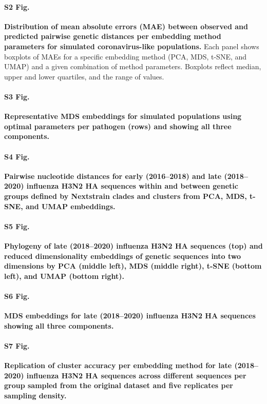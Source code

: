\documentclass[10pt,letterpaper]{article}
\begin{document}
\paragraph*{S2 Fig.}
\label{S2_Fig_simulated_coronavirus_errors}
{\bf Distribution of mean absolute errors (MAE) between observed and predicted pairwise genetic distances per embedding method parameters for simulated coronavirus-like populations.} Each panel shows boxplots of MAEs for a specific embedding method (PCA, MDS, t-SNE, and UMAP) and a given combination of method parameters. Boxplots reflect median, upper and lower quartiles, and the range of values.

\paragraph*{S3 Fig.}
\label{S3_Fig_simulated_representative_mds_embeddings}
{\bf Representative MDS embeddings for simulated populations using optimal parameters per pathogen (rows) and showing all three components.}

\paragraph*{S4 Fig.}
\label{S4_Fig_flu_within_between_group_distances}
{\bf Pairwise nucleotide distances for early (2016--2018) and late (2018--2020) influenza H3N2 HA sequences within and between genetic groups defined by Nextstrain clades and clusters from PCA, MDS, t-SNE, and UMAP embeddings.}

\paragraph*{S5 Fig.}
\label{S5_Fig_late_flu_embeddings_by_clade}
{\bf Phylogeny of late (2018--2020) influenza H3N2 HA sequences (top) and reduced dimensionality embeddings of genetic sequences into two dimensions by PCA (middle left), MDS (middle right), t-SNE (bottom left), and UMAP (bottom right).}

\paragraph*{S6 Fig.}
\label{S6_Fig_late_flu_mds_embeddings}
{\bf MDS embeddings for late (2018--2020) influenza H3N2 HA sequences showing all three components.}

\paragraph*{S7 Fig.}
\label{S7_Fig_late_flu_replication_of_cluster_accuracy}
{\bf Replication of cluster accuracy per embedding method for late (2018--2020) influenza H3N2 HA sequences across different sequences per group sampled from the original dataset and five replicates per sampling density.}
\end{document}
